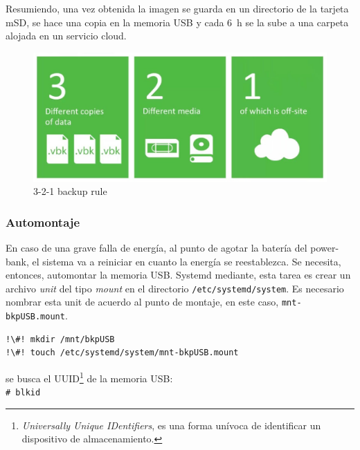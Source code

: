 \documentclass[10pt,a4paper]{article}
\begin{document}
Resumiendo, una vez obtenida la imagen se guarda en un directorio de la tarjeta mSD, se hace una copia en la memoria USB y cada \SI{6}{h} se la sube a una carpeta alojada en un servicio cloud.

\begin{figure}
\centering
    \includegraphics[scale=0.2]{321backup.jpg}
    \caption{3-2-1 backup rule}
    \label{fig:321bkp}
\end{figure}

\subsubsection{Automontaje}

En caso de una grave falla de energ\'ia, al punto de agotar la bater\'ia del power-bank, el sistema va a reiniciar en cuanto la energ\'ia se reestablezca. Se necesita, entonces, automontar la memoria USB. Systemd mediante, esta tarea es crear un archivo \emph{unit} del tipo \emph{mount} en el directorio \texttt{/etc/systemd/system}. Es necesario nombrar esta unit de acuerdo al punto de montaje, en este caso, \texttt{mnt-bkpUSB.mount}.
\begin{lstlisting}
!\#! mkdir /mnt/bkpUSB
!\#! touch /etc/systemd/system/mnt-bkpUSB.mount
\end{lstlisting}

se busca el UUID\footnote{\emph{Universally Unique IDentifiers}, es una forma un\'ivoca de identificar un dispositivo de almacenamiento.} de la memoria USB:\\
\lstinline{# blkid}\\
\end{document}
